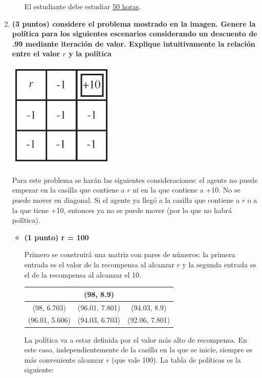 \documentclass[a4paper,10pt]{article}
\begin{document}
\begin{enumerate}
\begin{enumerate}
El estudiante debe estudiar \underline{50 horas}.

   \end{enumerate}
 
	\item \textbf{(3 puntos) considere el problema mostrado en la imagen. Genere la política para los siguientes escenarios considerando un descuento de .99 mediante iteración de valor. Explique intuitivamente la relación entre el valor $r$ y la política}

    \includegraphics[width=0.4\textwidth]{img8}

Para este problema se harán las siguientes consideraciones: el agente no puede empezar en la casilla que contiene a $r$ ni en la que contiene a +10. No se puede mover en diagonal. Si el agente ya llegó a la casilla que contiene a $r$ o a la que tiene +10, entonces ya no se puede mover (por lo que no habrá política).

	\begin{itemize}
		\item \textbf{(1 punto)  r = 100}
		
Primero se construirá una matriz con pares de números: la primera entrada es el valor de la recompensa al alcanzar $r$ y la segunda entrada es el de la recompensa al alcanzar el 10.

\begin{tabular}{|c|c|c|}
\hline
 & (98, 8.9) & \\ \hline
(98, 6.703) & (96.01, 7.801) & (94.03, 8.9) \\ \hline
(96.01, 5.606) & (94.03, 6.703) & (92.06, 7.801) \\ \hline
\end{tabular}

La política va a estar definida por el valor más alto de recompensa. En este caso, independientemente de la casilla en la que se inicie, siempre es más conveniente alcanzar $r$ (que vale 100). La tabla de políticas es la siguiente:


\end{itemize}
\end{enumerate}
\end{document}
